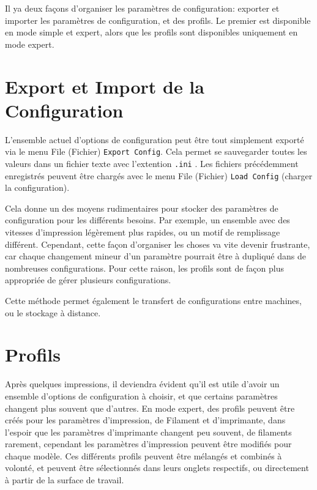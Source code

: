 
Il ya deux façons d'organiser les param\`etres de configuration: exporter et importer les param\`etres de configuration, et des profils. Le premier est disponible en mode simple et expert, alors que les profils sont disponibles uniquement en mode expert.

\section{Export et Import de la Configuration} %
\label{sub:exporting_and_importing_configuration}

L'ensemble actuel d'options de configuration peut \^etre tout simplement export\'e via le menu File (Fichier)  \texttt{Export Config}. Cela permet se sauvegarder toutes les valeurs dans un fichier texte avec l'extention \texttt{.ini} .  Les fichiers pr\'ec\'edemment enregistr\'es peuvent \^etre charg\'es avec le menu File (Fichier) \texttt{Load Config} (charger la configuration).

Cela donne un des moyens rudimentaires pour stocker des param\`etres de configuration pour les diff\'erents besoins. Par exemple, un ensemble avec des vitesses d'impression l\'eg\`erement plus rapides, ou un motif de remplissage diff\'erent. Cependant, cette façon d'organiser les choses va vite devenir frustrante, car chaque changement mineur d'un param\`etre pourrait \^etre \`a dupliqu\'e dans de nombreuses configurations. Pour cette raison, les profils sont de façon plus appropri\'ee de g\'erer plusieurs configurations.

Cette m\'ethode permet \'egalement le transfert de configurations entre machines, ou le stockage \`a distance.



\section{Profils} %
\label{sec:profiles}

Apr\`es quelques impressions, il deviendra \'evident qu'il est utile d'avoir un ensemble d'options de configuration \`a choisir, et que certains param\`etres changent plus souvent que d'autres. En mode expert, des profils peuvent \^etre cr\'e\'es pour les param\`etres d'impression, de Filament et d'imprimante, dans l'espoir que les param\`etres d'imprimante changent peu souvent, de filaments rarement, cependant les param\`etres d'impression peuvent \^etre modifi\'es pour chaque mod\`ele. Ces diff\'erents profils peuvent \^etre m\'elang\'es et combin\'es \`a volont\'e, et peuvent \^etre s\'electionn\'es dans leurs onglets respectifs, ou directement \`a partir de la surface de travail.


